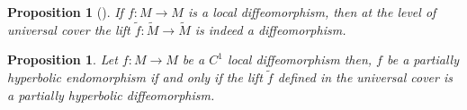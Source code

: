 \documentclass[12pt,reqno]{amsart}
\numberwithin{equation}{section}
\theoremstyle{plain}
\newtheorem{proposition}[theorem]{Proposition}
\theoremstyle{remark}
\begin{document}
\begin{proposition}[\cite{MP75}]\label{prop MP1}
If $f: M \rightarrow M$ is a  local diffeomorphism, then at the level of universal cover the lift
$\widetilde{f}:\widetilde{M}\rightarrow\widetilde{M}$ is indeed a diffeomorphism.
\end{proposition}




\begin{proposition}\label{pro 6}
Let $f:M\rightarrow M$ be a $C^1$ local diffeomorphism then, $f$ be a partially hyperbolic endomorphism if and only if the lift $\widetilde{f}$  defined in the universal cover is a partially hyperbolic diffeomorphism.
\end{proposition}

\end{document}
